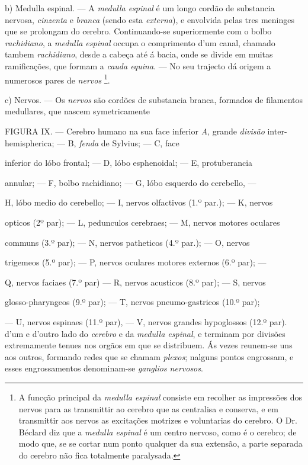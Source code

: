 b) Medulla espinal. --- A \emph{medulla espinal} é um longo cordão de substancia nervosa, \emph{cinzenta} e \emph{branca} (sendo esta \emph{externa}), e envolvida pelas tres meninges que se prolongam do cerebro. Continuando-se superiormente com o bolbo \emph{rachidiano}, a   \emph{medulla espinal} occupa o comprimento d'um canal, chamado tambem \emph{rachidiano}, desde a cabeça até á bacia, onde se divide em muitas ramificações, que formam a \emph{cauda equina}. --- No seu trajecto dá origem a numerosos pares de \emph{nervos} \footnote{A funcção principal da \emph{medulla espinal} consiste em recolher as impressões dos nervos para as transmittir ao cerebro que as centralisa e conserva, e em transmittir aos nervos as excitações motrizes e voluntarias do cerebro. O Dr. Béclard diz que a \emph{medulla espinal} é um centro nervoso, como é o cerebro; de modo que, se se cortar num ponto qualquer da sua extensão, a parte separada do cerebro não fica totalmente paralysada.}.

c) Nervos. --- Os \emph{nervos} são cordões de substancia branca, formados de filamentos medullares, que nascem symetricamente

FIGURA IX. --- Cerebro humano na sua face inferior \emph{A}, grande \emph{divisão} inter-hemispherica; --- B, \emph{fenda} de Sylvius; --- C, face

inferior do lóbo frontal; --- D, lóbo esphenoidal; --- E, protuberancia

annular; --- F, bolbo rachidiano; --- G, lóbo esquerdo do cerebello, ---

H, lóbo medio do cerebello; --- I, nervos olfactivos (1.º par.); --- K, nervos

opticos (2º par); --- L, pedunculos cerebraes; --- M, nervos motores oculares

communs (3.º par); --- N, nervos patheticos (4.º par.); --- O, nervos

trigemeos (5.º par); --- P, nervos oculares motores externos (6.º par); ---

Q, nervos faciaes (7.º par) --- R, nervos acusticos (8.º par); --- S, nervos

glosso-pharyngeos (9.º par); --- T, nervos pneumo-gastricos (10.º par);

--- U, nervos espinaes (11.º par), --- V, nervos grandes hypoglossos (12.º par). d'um e d'outro lado do \emph{cerebro} e da \emph{medulla espinal}, e terminam por divisões extremamente tenues nos orgãos em que se distribuem. Ás vezes reunem-se uns aos outros, formando redes que se chamam \emph{plexos}; nalguns pontos engrossam, e esses engrossamentos denominam-se \emph{ganglios nervosos}.

